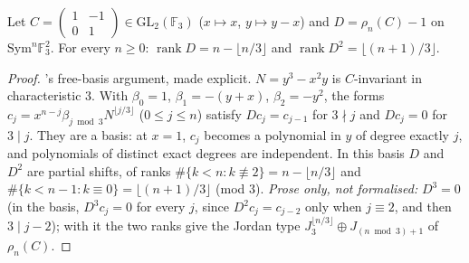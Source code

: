 \begin{theorem}\label{thm:lg-c3-jordan}
  \leanok
  Let $C=\begin{pmatrix}1&-1\\0&1\end{pmatrix}\in\mathrm{GL}_2(\mathbb F_3)$ ($x\mapsto x$, $y\mapsto y-x$) and $D=\rho_n(C)-1$ on
  $\mathrm{Sym}^n\mathbb F_3^2$.  For every $n\ge0$: $\operatorname{rank}D=n-\lfloor n/3\rfloor$ and $\operatorname{rank}D^2=\lfloor(n+1)/3\rfloor$.
\end{theorem}
\begin{proof}
  \leanok
  [R]'s free-basis argument, made explicit.  $N=y^3-x^2y$ is $C$-invariant in characteristic $3$.  With $\beta_0=1$, $\beta_1=-(y+x)$,
  $\beta_2=-y^2$, the forms $c_j=x^{n-j}\beta_{j\bmod3}N^{\lfloor j/3\rfloor}$ ($0\le j\le n$) satisfy $Dc_j=c_{j-1}$ for $3\nmid j$ and
  $Dc_j=0$ for $3\mid j$.  They are a basis: at $x=1$, $c_j$ becomes a polynomial in $y$ of degree exactly $j$, and polynomials of
  distinct exact degrees are independent.  In this basis $D$ and $D^2$ are partial shifts, of ranks
  $\#\{k<n:k\not\equiv2\}=n-\lfloor n/3\rfloor$ and $\#\{k<n-1:k\equiv0\}=\lfloor(n+1)/3\rfloor$ (mod $3$).
  \emph{Prose only, not formalised:} $D^3=0$ (in the basis, $D^3c_j=0$ for every $j$, since $D^2c_j=c_{j-2}$ only when
  $j\equiv2$, and then $3\mid j-2$); with it the two ranks give the Jordan type $J_3^{\lfloor n/3\rfloor}\oplus J_{(n\bmod3)+1}$ of
  $\rho_n(C)$.
\end{proof}

